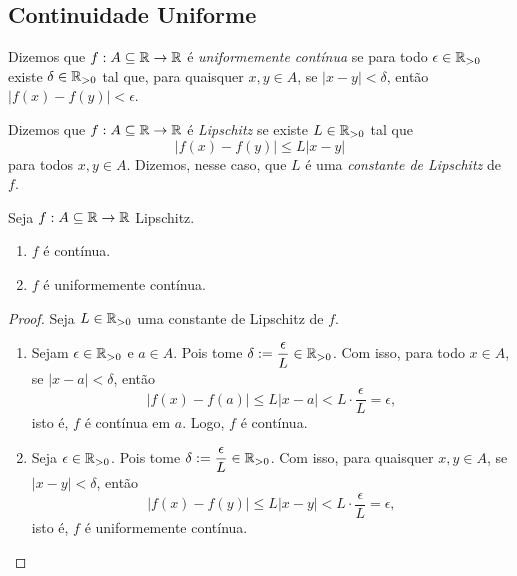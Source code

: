 \subsection{Continuidade Uniforme}

\begin{definition}
    Dizemos que $f : A \subseteq \mathbb{R} \to \mathbb{R}$ é \emph{uniformemente contínua} se para todo $\epsilon \in \mathbb{R}_{>0}$ existe $\delta \in \mathbb{R}_{>0}$ tal que, para quaisquer $x,y \in A$, se $|x-y| < \delta$, então $|f(x) - f(y)| < \epsilon$.
\end{definition}

\begin{definition}
    Dizemos que $f : A \subseteq \mathbb{R} \to \mathbb{R}$ é \emph{Lipschitz} se existe $L \in \mathbb{R}_{>0}$ tal que
        \[
            |f(x) - f(y)| \leq L|x-y|
        \]
    para todos $x,y \in A$. Dizemos, nesse caso, que $L$ é uma \emph{constante de Lipschitz} de $f$.
\end{definition}

\begin{proposition}
    Seja $f : A \subseteq \mathbb{R} \to \mathbb{R}$ Lipschitz. 
        \begin{enumerate}[leftmargin=*, align=left, label=\textbf{(\alph*)}]
            \item $f$ é contínua.
            \item $f$ é uniformemente contínua.
        \end{enumerate}
\end{proposition}

\begin{proof}
    Seja $L \in \mathbb{R}_{>0}$ uma constante de Lipschitz de $f$.
        \begin{enumerate}[leftmargin=*, align=left, label=\textbf{(\alph*)}]
            \item Sejam $\epsilon \in \mathbb{R}_{>0}$ e $a \in A$. Pois tome $\delta := \dfrac{\epsilon}{L} \in \mathbb{R}_{>0}$. Com isso, para todo $x \in A$, se $|x-a|<\delta$, então
                \[
                    |f(x) - f(a)| \leq L|x-a| < L \cdot \dfrac{\epsilon}{L} = \epsilon,
                \]
            isto é, $f$ é contínua em $a$. Logo, $f$ é contínua. \blackproof
            \item Seja $\epsilon \in \mathbb{R}_{>0}$. Pois tome $\delta := \dfrac{\epsilon}{L} \in \mathbb{R}_{>0}$. Com isso, para quaisquer $x,y \in A$, se $|x-y|<\delta$, então
                \[
                    |f(x) - f(y)| \leq L|x-y| < L \cdot \dfrac{\epsilon}{L} = \epsilon,
                \]
            isto é, $f$ é uniformemente contínua. \blackproof
        \end{enumerate}
\end{proof}

